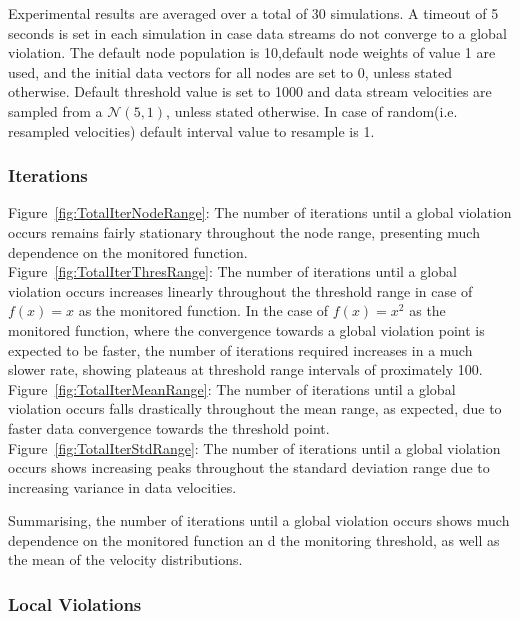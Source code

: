 \documentclass{article}
\begin{document}
		Experimental results are averaged over a total of 30 simulations. A timeout of 5 seconds is set in each simulation in case data streams do not converge to a global violation. The default node population is 10,default node weights of value 1 are used, and the initial data vectors for all nodes are set to 0, unless stated otherwise. Default threshold value is set to 1000 and data stream velocities are sampled from a $\mathcal{N} (5,1)$, unless stated otherwise. In case of random(i.e. resampled velocities) default interval value to resample is 1.
		
		\subsubsection{Iterations}
			
			Figure~\ref{fig:TotalIterNodeRange}: The number of iterations until a global violation occurs remains fairly stationary throughout the node range, presenting much dependence on the monitored function.\\
			Figure~\ref{fig:TotalIterThresRange}: The number of iterations until a global violation occurs increases linearly throughout the threshold range in case of $f(x)=x$ as the monitored function. In the case of $f(x)=x^2$ as the monitored function, where the convergence towards a global violation point is expected to be faster, the number of iterations required increases in a much slower rate, showing plateaus at threshold range intervals of proximately 100.\\
			Figure~\ref{fig:TotalIterMeanRange}: The number of iterations until a global violation occurs falls drastically throughout the mean range, as expected, due to faster data convergence towards the threshold point.\\
			Figure~\ref{fig:TotalIterStdRange}: The number of iterations until a global violation occurs shows increasing peaks throughout the standard deviation range due to increasing variance in data velocities.
			
			Summarising, the number of iterations until a global violation occurs shows much dependence on the monitored function an d the monitoring threshold, as well as the mean of the velocity distributions.
			
		\subsubsection{Local Violations}
			
\end{document}
